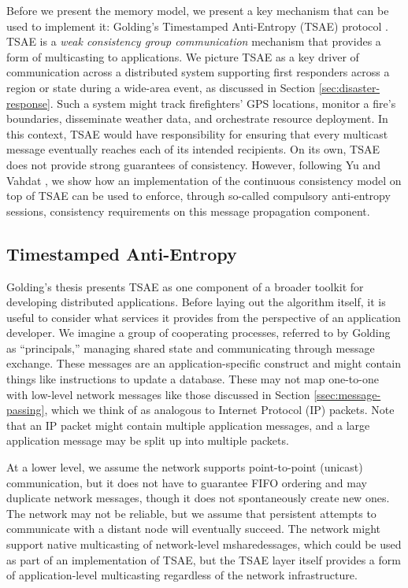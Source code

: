 \documentclass[]             %
{NASA}                       %
\theoremstyle{definition}
\begin{document}
Before we present the memory model, we present a key mechanism that
can be used to implement it: Golding's Timestamped Anti-Entropy (TSAE)
protocol \cite{1992:golding-thesis}. TSAE is a \emph{weak consistency
  group communication} mechanism that provides a form of multicasting
to applications. We picture TSAE as a key driver of communication
across a distributed system supporting first responders across a
region or state during a wide-area event, as discussed in Section
\ref{sec:disaster-response}. Such a system might track firefighters'
GPS locations, monitor a fire's boundaries, disseminate weather data,
and orchestrate resource deployment. In this context, TSAE would have
responsibility for ensuring that every multicast message eventually
reaches each of its intended recipients. On its own, TSAE does not
provide strong guarantees of consistency. However, following Yu and
Vahdat \cite{2002tact}, we show how an implementation of the
continuous consistency model on top of TSAE can be used to enforce,
through so-called compulsory anti-entropy sessions, consistency
requirements on this message propagation component.

\subsection{Timestamped Anti-Entropy}
\label{ssec:tsae}
Golding's thesis \cite{1992:golding-thesis} presents TSAE as one
component of a broader toolkit for developing distributed
applications. Before laying out the algorithm itself, it is useful to
consider what services it provides from the perspective of an
application developer. We imagine a group of cooperating processes,
referred to by Golding as ``principals,'' managing shared state and
communicating through message exchange. These messages are an
application-specific construct and might contain things like
instructions to update a database. These may not map one-to-one with
low-level network messages like those discussed in Section
\ref{ssec:message-passing}, which we think of as analogous to Internet
Protocol (IP) packets. Note that an IP packet might contain multiple
application messages, and a large application message may be split up
into multiple packets.

At a lower level, we assume the network supports point-to-point
(unicast) communication, but it does not have to guarantee FIFO
ordering and may duplicate network messages, though it does not
spontaneously create new ones. The network may not be reliable, but we
assume that persistent attempts to communicate with a distant node
will eventually succeed. The network might support native multicasting
of network-level msharedessages, which could be used as part of an
implementation of TSAE, but the TSAE layer itself provides a form of
application-level multicasting regardless of the network
infrastructure.
\end{document}
